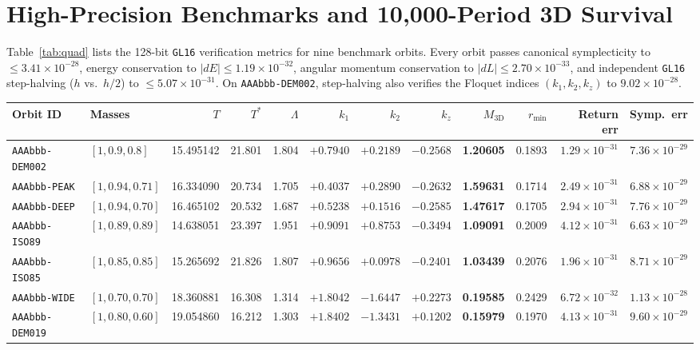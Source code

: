 \documentclass[11pt,a4paper]{article}
\begin{document}
\section{High-Precision Benchmarks and 10,000-Period 3D Survival}
Table~\ref{tab:quad} lists the 128-bit \texttt{GL16} verification metrics for nine benchmark orbits.
Every orbit passes canonical symplecticity to $\le 3.41 \times 10^{-28}$, energy conservation to $|dE| \le 1.19 \times 10^{-32}$, angular momentum conservation to $|dL| \le 2.70 \times 10^{-33}$, and independent \texttt{GL16} step-halving ($h$ vs.\ $h/2$) to $\le 5.07 \times 10^{-31}$.
On \texttt{AAAbbb-DEM002}, step-halving also verifies the Floquet indices $(k_1, k_2, k_z)$ to $9.02 \times 10^{-28}$.

\begin{table}[t]
  \centering
  \scriptsize
  \setlength{\tabcolsep}{3.5pt}
  \begin{tabular}{@{}llrrrrrrrrrr@{}}
    \toprule
    Orbit ID & Masses & $T$ & $T^*$ & $\Lambda$ & $k_1$ & $k_2$ & $k_z$ & $M_{3\text{D}}$ & $r_{\min}$ & Return err & Symp.\ err \\
    \midrule
    \texttt{AAAbbb-DEM002} & $[1,0.9,0.8]$ & 15.495142 & 21.801 & 1.804 & $+0.7940$ & $+0.2189$ & $-0.2568$ & \textbf{1.20605} & 0.1893 & $1.29\times10^{-31}$ & $7.36\times10^{-29}$ \\
    \texttt{AAAbbb-PEAK}   & $[1,0.94,0.71]$ & 16.334090 & 20.734 & 1.705 & $+0.4037$ & $+0.2890$ & $-0.2632$ & \textbf{1.59631} & 0.1714 & $2.49\times10^{-31}$ & $6.88\times10^{-29}$ \\
    \texttt{AAAbbb-DEEP}   & $[1,0.94,0.70]$ & 16.465102 & 20.532 & 1.687 & $+0.5238$ & $+0.1516$ & $-0.2585$ & \textbf{1.47617} & 0.1705 & $2.94\times10^{-31}$ & $7.76\times10^{-29}$ \\
    \texttt{AAAbbb-ISO89}  & $[1,0.89,0.89]$ & 14.638051 & 23.397 & 1.951 & $+0.9091$ & $+0.8753$ & $-0.3494$ & \textbf{1.09091} & 0.2009 & $4.12\times10^{-31}$ & $6.63\times10^{-29}$ \\
    \texttt{AAAbbb-ISO85}  & $[1,0.85,0.85]$ & 15.265692 & 21.826 & 1.807 & $+0.9656$ & $+0.0978$ & $-0.2401$ & \textbf{1.03439} & 0.2076 & $1.96\times10^{-31}$ & $8.71\times10^{-29}$ \\
    \texttt{AAAbbb-WIDE}   & $[1,0.70,0.70]$ & 18.360881 & 16.308 & 1.314 & $+1.8042$ & $-1.6447$ & $+0.2273$ & \textbf{0.19585} & 0.2429 & $6.72\times10^{-32}$ & $1.13\times10^{-28}$ \\
    \texttt{AAAbbb-DEM019} & $[1,0.80,0.60]$ & 19.054860 & 16.212 & 1.303 & $+1.8402$ & $-1.3431$ & $+0.1202$ & \textbf{0.15979} & 0.1970 & $4.13\times10^{-31}$ & $9.60\times10^{-29}$ \\

\end{tabular}
\end{table}
\end{document}
